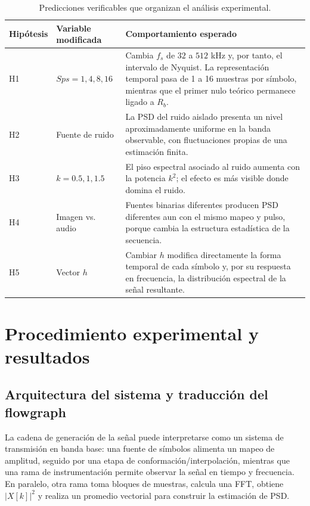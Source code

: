\documentclass[journal]{IEEEtran}
\begin{document}
\begin{table}[t]
\centering
\caption{Predicciones verificables que organizan el análisis experimental.}
\label{tab:predicciones}
\begin{tabular}{p{}p{}p{}}
\toprule
Hipótesis & Variable modificada & Comportamiento esperado\\
\midrule
H1 & $Sps=1,4,8,16$ & Cambia $f_s$ de $32$ a $512$ kHz y, por tanto, el intervalo de Nyquist. La representación temporal pasa de 1 a 16 muestras por símbolo, mientras que el primer nulo teórico permanece ligado a $R_b$.\\
H2 & Fuente de ruido & La PSD del ruido aislado presenta un nivel aproximadamente uniforme en la banda observable, con fluctuaciones propias de una estimación finita.\\
H3 & $k=0.5,1,1.5$ & El piso espectral asociado al ruido aumenta con la potencia $k^2$; el efecto es más visible donde domina el ruido.\\
H4 & Imagen vs. audio & Fuentes binarias diferentes producen PSD diferentes aun con el mismo mapeo y pulso, porque cambia la estructura estadística de la secuencia.\\
H5 & Vector $h$ & Cambiar $h$ modifica directamente la forma temporal de cada símbolo y, por su respuesta en frecuencia, la distribución espectral de la señal resultante.\\
\bottomrule
\end{tabular}
\end{table}

\section{Procedimiento experimental y resultados}

\subsection{Arquitectura del sistema y traducción del flowgraph}
La cadena de generación de la señal puede interpretarse como un sistema de transmisión en banda base: una fuente de símbolos alimenta un mapeo de amplitud, seguido por una etapa de conformación/interpolación, mientras que una rama de instrumentación permite observar la señal en tiempo y frecuencia. En paralelo, otra rama toma bloques de muestras, calcula una FFT, obtiene $|X[k]|^2$ y realiza un promedio vectorial para construir la estimación de PSD.
\end{document}
